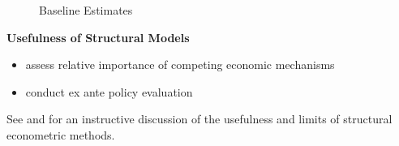 \begin{frame}\begin{figure}\caption{Baseline Estimates}\vspace{0.3cm}
\end{figure}\end{frame}
\begin{frame}\textbf{Usefulness of Structural Models}\vspace{0.3cm}

\begin{itemize}\setlength\itemsep{1em}
\item assess relative importance of competing economic mechanisms
\item conduct ex ante policy evaluation
\end{itemize}\vspace{0.5cm}

See  and  for an instructive discussion of the usefulness and limits of structural econometric methods.

\end{frame}
